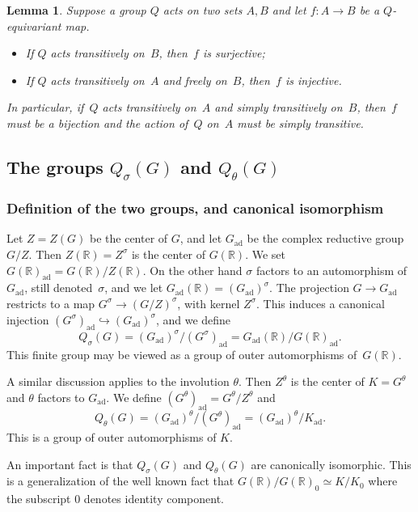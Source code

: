 \documentclass[10pt,leqno]{article}
\newtheorem{lemma}[equation]{Lemma}
\numberwithin{equation}{section}
\newcommand{\ad}{\mathrm{ad}}
\newcommand{\Gad}{G_\mathrm{ad}}
\newcommand{\Kad}{K_\mathrm{ad}}
\newcommand{\R}{\mathbb R}
\newcommand{\G}{G}
\begin{document}
\begin{lemma} Suppose a group $Q$ acts on two sets $A, B$ and let $f\colon A \to B$ be a $Q$-equivariant map. 
\begin{itemize}
\item[(a)] If $Q$ acts transitively on~$B$,  then~$f$ is surjective\textup{;}
\item[(b)] If $Q$ acts transitively on~$A$ and freely on~$B$, then~$f$ is injective.
\end{itemize}
In particular, if~$Q$ acts transitively on~$A$ and simply transitively on~$B$, then~$f$ must be a bijection and the action of~$Q$ on~$A$ must be simply transitive.
\end{lemma}

\subsection{The groups $Q_\sigma(G)$ and $Q_{\theta}(G)$}

\subsubsection{Definition of the two groups, and canonical isomorphism}

Let $Z=Z(G)$ be the center of $G$, and let $\Gad$ be the complex reductive group~$G/Z$.
Then $Z(\R)=Z^\sigma$ is the center of $G(\R)$. We set $\G(\R)_\ad=G(\R)/Z(\R)$.
On the other hand  $\sigma$ factors to an automorphism  of $\Gad$, still denoted~$\sigma$, and we let  $\Gad(\R)=(\Gad)^\sigma$.
The projection $G\rightarrow \Gad$ restricts to a map $G^\sigma\rightarrow (G/Z)^\sigma$, with kernel $Z^\sigma$.
This induces a canonical injection $(G^\sigma)_\ad\hookrightarrow (\Gad)^\sigma$, and we define
$$
Q_\sigma(G)=(\Gad)^\sigma/(G^\sigma)_\ad=\Gad(\R)/\G(\R)_\ad.
$$
This finite group may be viewed as a group of outer automorphisms of~$G(\R)$.

A similar discussion applies to the involution $\theta$.
Then $Z^\theta$ is the center of $K=G^\theta$ and  $\theta$ factors to $\Gad$.
We define $(G^\theta)_\ad=G^\theta/Z^\theta$ and
$$
Q_\theta(G)=(\Gad)^\theta/(G^\theta)_\ad =(\Gad)^\theta/\Kad.
$$
This is a group of outer automorphisms of $K$. 

An important fact is that $Q_\sigma(G)$ and $Q_\theta(G)$ are canonically isomorphic. This is a generalization of the well known fact that
$G(\R)/G(\R)_0\simeq K/K_0$ where the subscript $0$ denotes identity component. 
\end{document}

